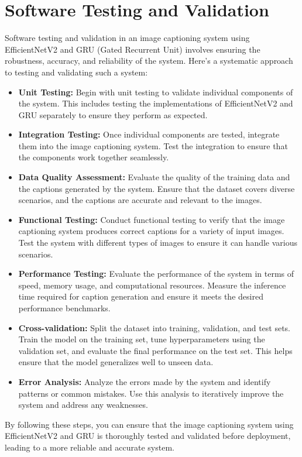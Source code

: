 \documentclass[oneside,a4paper,12pt]{report}
\begin{document}
\section{Software Testing and Validation}
Software testing and validation in an image captioning system using EfficientNetV2 and GRU (Gated Recurrent Unit) involves ensuring the robustness, accuracy, and reliability of the system. Here's a systematic approach to testing and validating such a system:
\begin{itemize}
\item{\textbf{Unit Testing:} }Begin with unit testing to validate individual components of the system. This includes testing the implementations of EfficientNetV2 and GRU separately to ensure they perform as expected.
\item{\textbf{Integration Testing:} }Once individual components are tested, integrate them into the image captioning system. Test the integration to ensure that the components work together seamlessly.
\item{\textbf{Data Quality Assessment:} }Evaluate the quality of the training data and the captions generated by the system. Ensure that the dataset covers diverse scenarios, and the captions are accurate and relevant to the images.
\item{\textbf{Functional Testing:} }Conduct functional testing to verify that the image captioning system produces correct captions for a variety of input images. Test the system with different types of images to ensure it can handle various scenarios.
\item{\textbf{Performance Testing:} }Evaluate the performance of the system in terms of speed, memory usage, and computational resources. Measure the inference time required for caption generation and ensure it meets the desired performance benchmarks.
\item{\textbf{Cross-validation:} }Split the dataset into training, validation, and test sets. Train the model on the training set, tune hyperparameters using the validation set, and evaluate the final performance on the test set. This helps ensure that the model generalizes well to unseen data.
\item {\textbf{Error Analysis:} }Analyze the errors made by the system and identify patterns or common mistakes. Use this analysis to iteratively improve the system and address any weaknesses.

\end{itemize}
By following these steps, you can ensure that the image captioning system using EfficientNetV2 and GRU is thoroughly tested and validated before deployment, leading to a more reliable and accurate system.
\end{document}
